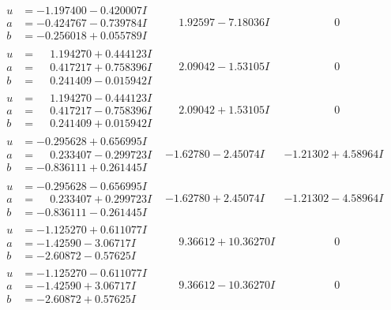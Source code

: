 \documentclass[1p]{elsarticle_modified}
\theoremstyle{definition}
\begin{document}
$$\begin{array}{c|c|c}
\begin{aligned}
u &= -1.197400 - 0.420007 I \\
a &= -0.424767 - 0.739784 I \\
b &= -0.256018 + 0.055789 I\end{aligned}
 & \phantom{-}1.92597 - 7.18036 I & \phantom{-0.000000 } 0 \\ \hline\begin{aligned}
u &= \phantom{-}1.194270 + 0.444123 I \\
a &= \phantom{-}0.417217 + 0.758396 I \\
b &= \phantom{-}0.241409 - 0.015942 I\end{aligned}
 & \phantom{-}2.09042 - 1.53105 I & \phantom{-0.000000 } 0 \\ \hline\begin{aligned}
u &= \phantom{-}1.194270 - 0.444123 I \\
a &= \phantom{-}0.417217 - 0.758396 I \\
b &= \phantom{-}0.241409 + 0.015942 I\end{aligned}
 & \phantom{-}2.09042 + 1.53105 I & \phantom{-0.000000 } 0 \\ \hline\begin{aligned}
u &= -0.295628 + 0.656995 I \\
a &= \phantom{-}0.233407 - 0.299723 I \\
b &= -0.836111 + 0.261445 I\end{aligned}
 & -1.62780 - 2.45074 I & -1.21302 + 4.58964 I \\ \hline\begin{aligned}
u &= -0.295628 - 0.656995 I \\
a &= \phantom{-}0.233407 + 0.299723 I \\
b &= -0.836111 - 0.261445 I\end{aligned}
 & -1.62780 + 2.45074 I & -1.21302 - 4.58964 I \\ \hline\begin{aligned}
u &= -1.125270 + 0.611077 I \\
a &= -1.42590 - 3.06717 I \\
b &= -2.60872 - 0.57625 I\end{aligned}
 & \phantom{-}9.36612 + 10.36270 I & \phantom{-0.000000 } 0 \\ \hline\begin{aligned}
u &= -1.125270 - 0.611077 I \\
a &= -1.42590 + 3.06717 I \\
b &= -2.60872 + 0.57625 I\end{aligned}
 & \phantom{-}9.36612 - 10.36270 I & \phantom{-0.000000 } 0 \\ \hline\begin{aligned}

\end{aligned}
\end{array}$$
\end{document}
